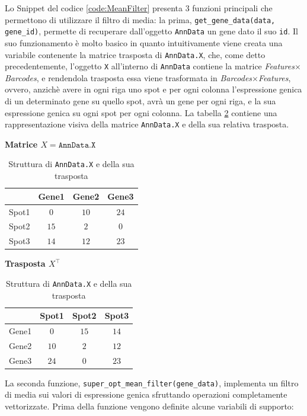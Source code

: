 Lo Snippet del codice \ref{code:MeanFilter} presenta 3 funzioni 
principali che permettono di utilizzare il filtro di media: la prima, 
\texttt{get\_gene\_data(data, gene\_id)}, permette di 
recuperare dall'oggetto \texttt{AnnData} un gene dato il suo \texttt{id}.
Il suo funzionamento è molto basico in quanto intuitivamente 
viene creata una variabile contenente la matrice trasposta 
di \texttt{AnnData.X}, che, come detto precedentemente, l'oggetto \texttt{X} 
all'interno di \texttt{AnnData} contiene la matrice 
\textit{Features}$\times$\textit{Barcodes}, e rendendola 
trasposta essa viene trasformata in 
\textit{Barcodes}$\times$\textit{Features}, ovvero, anzichè avere 
in ogni riga uno spot e per ogni colonna l'espressione 
genica di un determinato gene su quello spot, avrà 
un gene per ogni riga, e la sua espressione genica su 
ogni spot per ogni colonna.
La tabella \ref{tab:ann_data_and_transpose} contiene una 
rappresentazione visiva della matrice \texttt{AnnData.X} e 
della sua relativa trasposta.

\begin{table}[htbp]
  \centering
  \caption{Struttura di \texttt{AnnData.X} e della sua trasposta}
  \label{tab:ann_data_and_transpose}
  
  \textbf{Matrice $X = \texttt{AnnData.X}$} \\[0.5em]
  \begin{tabular}{c|ccc}
    & Gene1 & Gene2 & Gene3 \\
    \hline
    Spot1 & $0$ & $10$ & $24$ \\
    Spot2 & $15$ & $2$ & $0$ \\
    Spot3 & $14$ & $12$ & $23$ \\
  \end{tabular}

  \vspace{2em} 

  \textbf{Trasposta $X^\top$} \\[0.5em]
  \begin{tabular}{c|ccc}
    & Spot1 & Spot2 & Spot3 \\
    \hline
    Gene1 & $0$ & $15$ & $14$ \\
    Gene2 & $10$ & $2$ & $12$ \\
    Gene3 & $24$ & $0$ & $23$ \\
  \end{tabular}
  
\end{table}


La seconda funzione, \texttt{super\_opt\_mean\_filter(gene\_data)}, implementa un filtro di media sui valori di espressione genica sfruttando operazioni completamente vettorizzate.
Prima della funzione vengono definite alcune variabili di supporto:

